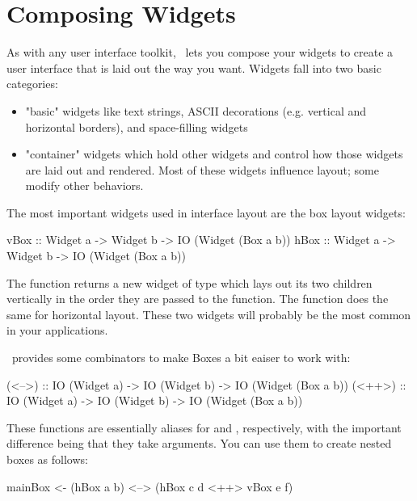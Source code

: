 \section{Composing Widgets}

As with any user interface toolkit, \vtyui\ lets you compose your
widgets to create a user interface that is laid out the way you want.
Widgets fall into two basic categories:

\begin{itemize}
\item "basic" widgets like text strings, ASCII decorations
      (e.g. vertical and horizontal borders), and space-filling
      widgets
\item "container" widgets which hold other widgets and control how
      those widgets are laid out and rendered.  Most of these widgets
      influence layout; some modify other behaviors.
\end{itemize}

The most important widgets used in interface layout are the box layout
widgets:

\begin{haskellcode}
 vBox :: Widget a -> Widget b -> IO (Widget (Box a b))
 hBox :: Widget a -> Widget b -> IO (Widget (Box a b))
\end{haskellcode}

The  function returns a new widget of type  which lays out its two children vertically in the order they are
passed to the function.  The  function does the same for
horizontal layout.  These two widgets will probably be the most common
in your applications.

\vtyui\ provides some combinators to make Boxes a bit eaiser to work
with:

\begin{haskellcode}
 (<-->) :: IO (Widget a) -> IO (Widget b) -> IO (Widget (Box a b))
 (<++>) :: IO (Widget a) -> IO (Widget b) -> IO (Widget (Box a b))
\end{haskellcode}

These functions are essentially aliases for  and ,
respectively, with the important difference being that they take
 arguments.  You can use them to create nested boxes as
follows:

\begin{haskellcode}
 mainBox <- (hBox a b) <--> (hBox c d <++> vBox e f)
\end{haskellcode}

